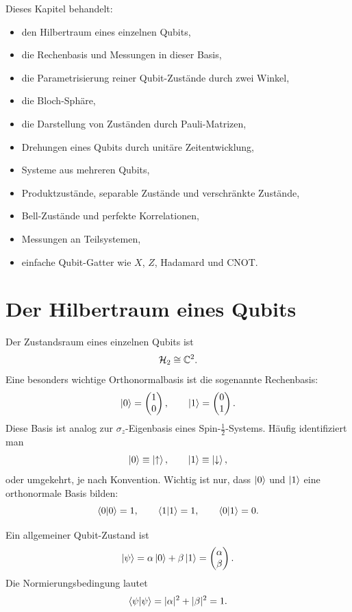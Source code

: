 Dieses Kapitel behandelt:
\begin{itemize}
    \item den Hilbertraum eines einzelnen Qubits,
    \item die Rechenbasis und Messungen in dieser Basis,
    \item die Parametrisierung reiner Qubit-Zustände durch zwei Winkel,
    \item die Bloch-Sphäre,
    \item die Darstellung von Zuständen durch Pauli-Matrizen,
    \item Drehungen eines Qubits durch unitäre Zeitentwicklung,
    \item Systeme aus mehreren Qubits,
    \item Produktzustände, separable Zustände und verschränkte Zustände,
    \item Bell-Zustände und perfekte Korrelationen,
    \item Messungen an Teilsystemen,
    \item einfache Qubit-Gatter wie \(X\), \(Z\), Hadamard und CNOT.
\end{itemize}

\section{Der Hilbertraum eines Qubits}

Der Zustandsraum eines einzelnen Qubits ist
\[
    \mathcal H_2 \cong \mathbb C^2.
\]
Eine besonders wichtige Orthonormalbasis ist die sogenannte Rechenbasis:
\[
    \left|0\right\rangle=\begin{pmatrix}1\\0\end{pmatrix},
    \qquad
    \left|1\right\rangle=\begin{pmatrix}0\\1\end{pmatrix}.
\]
Diese Basis ist analog zur \(\sigma_z\)-Eigenbasis eines Spin-\(\frac12\)-Systems. Häufig identifiziert man
\[
    \left|0\right\rangle\equiv \left|\uparrow\right\rangle,
    \qquad
    \left|1\right\rangle\equiv \left|\downarrow\right\rangle,
\]
oder umgekehrt, je nach Konvention. Wichtig ist nur, dass \(\left|0\right\rangle\) und \(\left|1\right\rangle\) eine orthonormale Basis bilden:
\[
    \left\langle0\middle|0\right\rangle=1,
    \qquad
    \left\langle1\middle|1\right\rangle=1,
    \qquad
    \left\langle0\middle|1\right\rangle=0.
\]

Ein allgemeiner Qubit-Zustand ist
\[
    \left|\psi\right\rangle=\alpha\left|0\right\rangle+\beta\left|1\right\rangle
    =\begin{pmatrix}\alpha\\\beta\end{pmatrix}.
\]
Die Normierungsbedingung lautet
\[
    \left\langle\psi\middle|\psi\right\rangle=|
    \alpha|^2+|\beta|^2=1.
\]

